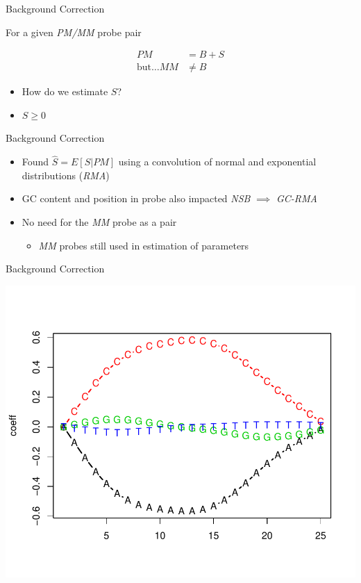 \documentclass[aspectratio=169,11pt]{beamer}
\begin{document}
\begin{frame}{Background Correction}

For a given \textit{PM/MM} probe pair

	\begin{align*}
		PM &= B + S\\[3mm]
		\text{but}\ldots MM &\neq B
	\end{align*}
	
	\begin{itemize}
		\item How do we estimate $S$?
		\item $S \geq 0$	
	\end{itemize}


\end{frame}

\begin{frame}{Background Correction}

	\begin{itemize}
		\item Found $\hat{S} = E[S|PM]$ using a convolution of normal and exponential distributions (\textit{RMA})
		\item GC content and position in probe also impacted \textit{NSB} $\implies$ \textit{GC-RMA}
		\item No need for the \textit{MM} probe as a pair
		\begin{itemize}
			\item \textit{MM} probes still used in estimation of parameters
		\end{itemize}
	\end{itemize}
	
\end{frame}

\begin{frame}{Background Correction}

	\begin{center}
\includegraphics[scale=0.55]{figures/GCRMA_baseprofile.pdf} 
	\end{center}
	
\end{frame}
\end{document}
